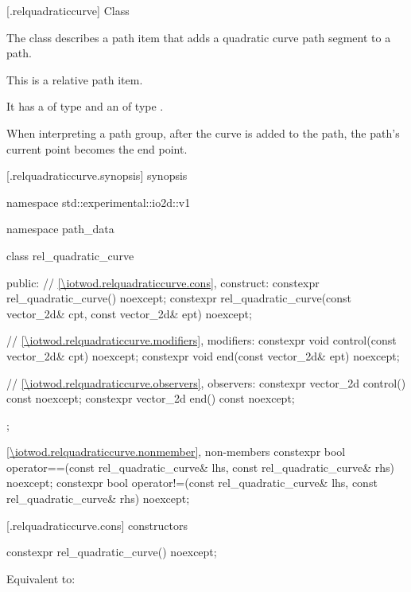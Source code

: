  [\iotwod.relquadraticcurve] {Class }

\pnum
{}%
The class  describes a path item that adds a quadratic \bezierlocal curve path segment to a path.

\pnum
This is a relative path item.

\pnum
It has a  of type  and an  of type .

\pnum
When interpreting a path group, after the curve is added to the path, the path's current point becomes the end point.


 [\iotwod.relquadraticcurve.synopsis] { synopsis}

\begin{codeblock}
namespace std::experimental::io2d::v1 {
  namespace path_data {
    class rel_quadratic_curve {
    public:
      // \ref{\iotwod.relquadraticcurve.cons}, construct:
      constexpr rel_quadratic_curve() noexcept;
      constexpr rel_quadratic_curve(const vector_2d& cpt, const vector_2d& ept)
        noexcept;

      // \ref{\iotwod.relquadraticcurve.modifiers}, modifiers:
      constexpr void control(const vector_2d& cpt) noexcept;
      constexpr void end(const vector_2d& ept) noexcept;

      // \ref{\iotwod.relquadraticcurve.observers}, observers:
      constexpr vector_2d control() const noexcept;
      constexpr vector_2d end() const noexcept;
    };
    
    \ref{\iotwod.relquadraticcurve.nonmember}, non-members
    constexpr bool operator==(const rel_quadratic_curve& lhs,
      const rel_quadratic_curve& rhs) noexcept;
    constexpr bool operator!=(const rel_quadratic_curve& lhs,
      const rel_quadratic_curve& rhs) noexcept;
  }
}
\end{codeblock}

 [\iotwod.relquadraticcurve.cons] { constructors}

%
\begin{itemdecl}
constexpr rel_quadratic_curve() noexcept;
\end{itemdecl}
\begin{itemdescr}
\pnum
\effects
Equivalent to: 
\end{itemdescr}

